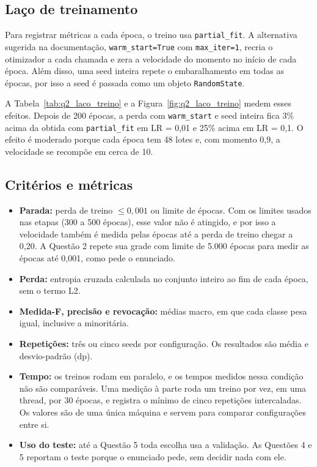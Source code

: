 \subsection{Laço de treinamento}

Para registrar métricas a cada época, o treino usa \texttt{partial\_fit}. A alternativa sugerida na documentação,
\texttt{warm\_start=True} com \texttt{max\_iter=1}, recria o otimizador a cada chamada e zera a velocidade do momento no início
de cada época. Além disso, uma seed inteira repete o embaralhamento em todas as épocas, por isso a seed é passada como
um objeto \texttt{RandomState}.

A Tabela~\ref{tab:q2_laco_treino} e a Figura~\ref{fig:q2_laco_treino} medem esses efeitos. Depois de 200 épocas, a perda
com \texttt{warm\_start} e seed inteira fica 3\% acima da obtida com \texttt{partial\_fit} em LR = 0,01 e 25\% acima em
LR = 0,1. O efeito é moderado porque cada época tem 48 lotes e, com momento 0,9, a velocidade se recompõe em cerca de 10.


\subsection{Critérios e métricas}

\begin{itemize}
  \item \textbf{Parada:} perda de treino $\le 0{,}001$ ou limite de épocas. Com os limites usados nas etapas (300 a 500 épocas), esse valor
    não é atingido, e por isso a velocidade também é medida pelas épocas até a perda de treino chegar a 0,20. A Questão 2 repete sua grade
    com limite de 5.000 épocas para medir as épocas até 0,001, como pede o enunciado.
  \item \textbf{Perda:} entropia cruzada calculada no conjunto inteiro ao fim de cada época, sem o termo L2.
  \item \textbf{Medida-F, precisão e revocação:} médias macro, em que cada classe pesa igual, inclusive a minoritária.
  \item \textbf{Repetições:} três ou cinco seeds por configuração. Os resultados são média e desvio-padrão (dp).
  \item \textbf{Tempo:} os treinos rodam em paralelo, e os tempos medidos nessa condição não são comparáveis. Uma medição
    à parte roda um treino por vez, em uma thread, por 30 épocas, e registra o mínimo de cinco repetições intercaladas. Os
    valores são de uma única máquina e servem para comparar configurações entre si.
  \item \textbf{Uso do teste:} até a Questão 5 toda escolha usa a validação. As Questões 4 e 5 reportam o teste porque o
    enunciado pede, sem decidir nada com ele.
\end{itemize}

\FloatBarrier
